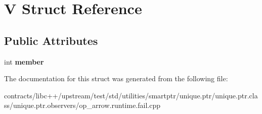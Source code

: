 \hypertarget{struct_v}{}\section{V Struct Reference}
\label{struct_v}
\subsection*{Public Attributes}
\begin{DoxyCompactItemize}
\item 
\mbox{\label{struct_v_a433ee79876057f292b3f09fdc743a928}} 
int {\bfseries member}
\end{DoxyCompactItemize}


The documentation for this struct was generated from the following file\+:\begin{DoxyCompactItemize}
\item 
contracts/libc++/upstream/test/std/utilities/smartptr/unique.\+ptr/unique.\+ptr.\+class/unique.\+ptr.\+observers/op\+\_\+arrow.\+runtime.\+fail.\+cpp\end{DoxyCompactItemize}
